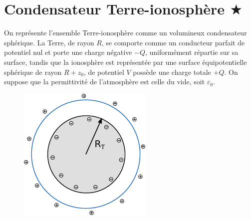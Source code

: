 \documentclass{report}
\begin{document}
\newpage

\section*{Condensateur Terre-ionosphère $\bigstar$}

On représente l'ensemble Terre-ionosphère comme un volumineux condensateur sphérique. La Terre, de rayon $R$, se comporte comme un conducteur parfait de potentiel nul et porte une charge négative $-Q$, uniformément répartie sur sa surface, tandis que la ionosphère est représentée par une surface équipotentielle sphérique de rayon $R+z_0$, de potentiel $V$ possède une charge totale $+Q$. On suppose que la permittivité de l'atmosphère est celle du vide, soit $\varepsilon_0$. 

\begin{figure}[h!]
\centering
		\includegraphics[scale=1]{em3.pdf}
\end{figure}
\end{document}
